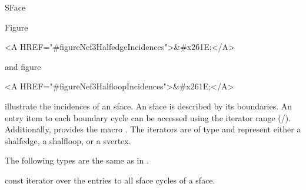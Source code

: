 
\ccRefPageBegin



\begin{ccRefClass}{SFace}

\ccDefinition

Figure~\begin{ccHtmlOnly}
  <A HREF="#figureNef3HalfedgeIncidences">&#x261E;</A>
\end{ccHtmlOnly} and
figure~\begin{ccHtmlOnly}
  <A HREF="#figureNef3HalfloopIncidences">&#x261E;</A>
\end{ccHtmlOnly} illustrate the incidences of an sface. An sface is described
by its boundaries. An entry item to each boundary cycle can be accessed
using the iterator range (/).
Additionally,  provides the macro 
. The iterators are of type 
 and represent either a shalfedge, a shalfloop,
or a svertex.



\ccTypes
{}
\ccThreeToTwo

The following types are the same as in .



\ccGlue
{}
\ccGlue
{}
\ccGlue
{}
{const iterator over the entries to all sface cycles of a sface.}


\end{ccRefClass}
